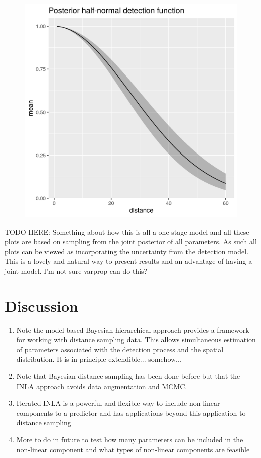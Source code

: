 \documentclass[preprint,12pt]{elsarticle}
\begin{document}
\begin{figure}
	\includegraphics[scale=0.6]{figures/halfnormal.png}
\end{figure}

\bigskip

TODO HERE:  Something about how this is all a one-stage model and all these plots are based on sampling from the joint posterior of all parameters.  As such all plots can be viewed as incorporating the uncertainty from the detection model.  This is a lovely and natural way to present results and an advantage of having a joint model.  I'm not sure varprop can do this?

\newpage

\section*{Discussion}

\begin{enumerate}
	\item Note the model-based Bayesian hierarchical approach provides a framework for working with distance sampling data.  This allows simultaneous estimation of parameters associated with the detection process and the spatial distribution.  It is in principle extendible... somehow...
	\item Note that Bayesian distance sampling has been done before but that the INLA approach avoids data augmentation and MCMC.
	\item Iterated INLA is a powerful and flexible way to include non-linear components to a predictor and has applications beyond this application to distance sampling
	\item More to do in future to test how many parameters can be included in the non-linear component and what types of non-linear components are feasible

\end{enumerate}



\end{document}
